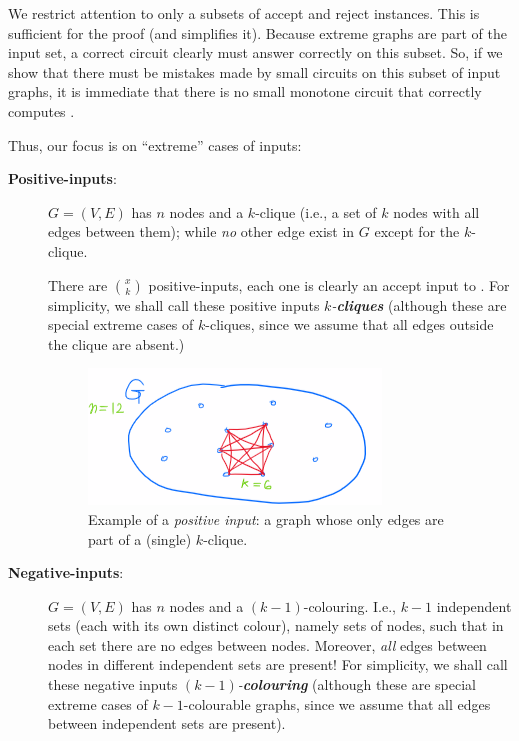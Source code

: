 We  restrict attention to only a subsets of accept and reject instances. This is sufficient for the proof (and simplifies it). 
Because extreme graphs are part of the input set, a correct circuit clearly must answer correctly on this subset. So, if we show that there must be mistakes made by small circuits on this subset of input graphs, it is immediate that there is no small monotone circuit that correctly computes \cliquenk.



Thus, our focus is on ``extreme'' cases of inputs:

\begin{description}
\item[\textbf{Positive-inputs}:] 
 $G=(V,E)$ has $n$ nodes and a $k$-clique (i.e., a set of $k$ nodes with all edges between them); while \emph{no} other edge exist in $G$ except for the $k$-clique.

There are $\binom{x}{k}$ positive-inputs, each one is clearly an accept input to \cliquenk.
For simplicity, we shall call these positive inputs \emph{$k$-\textbf{cliques}} (although these are special extreme cases of $k$-cliques, since we assume that all edges outside the clique are absent.) 

\begin{figure}[H]
    \centering
    \includegraphics[width=.5\linewidth]{images/clique1.png}
    \caption{Example of a \emph{positive input}: a graph whose only edges are part of a (single) $k$-clique.}
    \label{fig:enter-label}
\end{figure}


\item[\textbf{Negative-inputs}:] 

$G=\left(V,E\right)$ has $n$ nodes and a $(k-1)$-colouring. I.e., $k-1$ independent sets (each with its own distinct colour), namely sets of nodes, such that in each set there are no edges between nodes. Moreover,  \emph{all} edges between nodes in  different independent sets are present!
For simplicity, we shall call these negative inputs \emph{$(k-1)$-\textbf{colouring}} (although these are special extreme cases of $k-1$-colourable graphs, since we assume that all edges between independent sets are present). 



\end{description}
